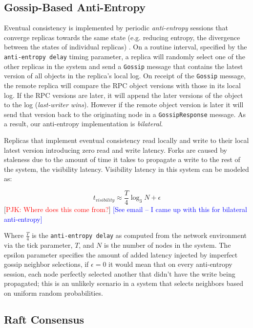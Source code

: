 \documentclass[10pt,conference,letterpaper]{IEEEtran}
\newcommand{\todo}[1]{{\textcolor{red}{#1}}}
\newcommand{\pjk}[1]{[\todo{PJK: #1}]}
\newcommand{\note}[1]{\textcolor{blue}{[#1]}}
\begin{document}
\subsection{Gossip-Based Anti-Entropy}

Eventual consistency is implemented by periodic \textit{anti-entropy} sessions that converge replicas towards the same state (e.g. reducing entropy, the divergence between the states of individual replicas) \cite{kempe_gossip-based_2003}. On a routine interval, specified by the \texttt{anti-entropy delay} timing parameter, a replica will randomly select one of the other replicas in the system and send a \texttt{Gossip} message that contains the latest version of all objects in the replica's local log. On receipt of the \texttt{Gossip} message, the remote replica will compare the RPC object versions with those in its local log. If the RPC versions are later, it will append the later versions of the object to the log (\textit{last-writer wins}). However if the remote object version is later it will send that version back to the originating node in a \texttt{GossipResponse} message. As a result, our anti-entropy implementation is \textit{bilateral}.

Replicas that implement eventual consistency read locally and write to their local latest version introducing zero read and write latency. Forks are caused by staleness due to the amount of time it takes to propagate a write to the rest of the system, the visibility latency. Visibility latency in this system can be modeled as:

\begin{equation}
t_{visibility} \approx \frac{T}{4} \log_3N + \epsilon
\end{equation}
\pjk{Where does this come from?}
\note{See email -- I came up with this for bilateral anti-entropy}

Where $\frac{T}{4}$ is the \texttt{anti-entropy delay} as computed from the network environment via the tick parameter, $T$, and $N$ is the number of nodes in the system. The epsilon parameter specifies the amount of added latency injected by imperfect gossip neighbor selections, if $\epsilon = 0$ it would mean that on every anti-entropy session, each node perfectly selected another that didn't have the write being propagated; this is an unlikely scenario in a system that selects neighbors based on uniform random probabilities.

\subsection{Raft Consensus}
\end{document}
